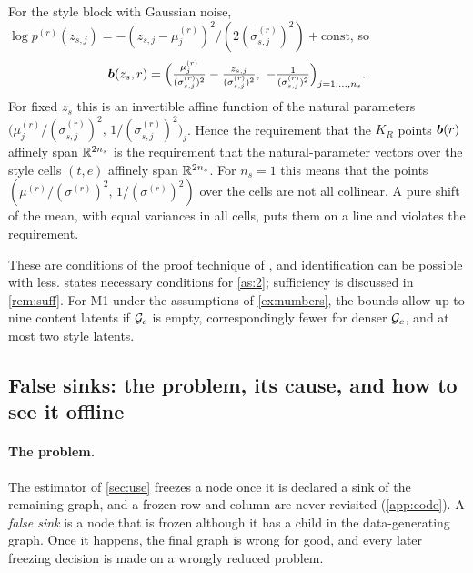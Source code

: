 For the style block with Gaussian noise, $\log p^{(r)}(z_{s,j})=-(z_{s,j}-\mu_j^{(r)})^2/(2(\sigma_{s,j}^{(r)})^2)+\text{const}$, so
\[
\boldsymbol{b}(z_s,r)=\Bigl(\tfrac{\mu_j^{(r)}}{(\sigma_{s,j}^{(r)})^2}-\tfrac{z_{s,j}}{(\sigma_{s,j}^{(r)})^2},\
-\tfrac1{(\sigma_{s,j}^{(r)})^2}\Bigr)_{j=1,\dots,n_s}.
\]
For fixed $z_s$ this is an invertible affine function of the natural parameters
$\bigl(\mu_j^{(r)}/(\sigma_{s,j}^{(r)})^2,\,1/(\sigma_{s,j}^{(r)})^2\bigr)_j$. Hence the requirement that the
$K_R$ points $\boldsymbol{b}(r)$ affinely span $\mathbb{R}^{2n_s}$ is the requirement that the natural-parameter vectors
over the style cells $(t,e)$ affinely span $\mathbb{R}^{2n_s}$. For $n_s=1$ this means that the points
$(\mu^{(r)}/(\sigma^{(r)})^2,\,1/(\sigma^{(r)})^2)$ over the cells are not all collinear. A pure shift of the
mean, with equal variances in all cells, puts them on a line and violates the requirement.

\begin{remark}
These are conditions of the proof technique of \cite{ng2025}, and identification can be possible with
less. \Cref{prop:m1req} states necessary conditions for \cref{as:2}; sufficiency is discussed in
\cref{rem:suff}. For M1 under the assumptions of \cref{ex:numbers}, the bounds allow up to nine content
latents if $\mathcal{G}_c$ is empty, correspondingly fewer for denser $\mathcal{G}_c$, and at most two style latents.
\end{remark}

\subsection{False sinks: the problem, its cause, and how to see it offline}
\label{sec:apply:falsesink}

\paragraph{The problem.}
The estimator of \cref{sec:use} freezes a node once it is declared a sink of the remaining graph, 
and a frozen row and column are never revisited (\cref{app:code}). A \emph{false sink} is a node 
that is frozen although it has a child in the data-generating graph. Once it happens, the final 
graph is wrong for good, and every later freezing decision is made on a wrongly reduced problem.

